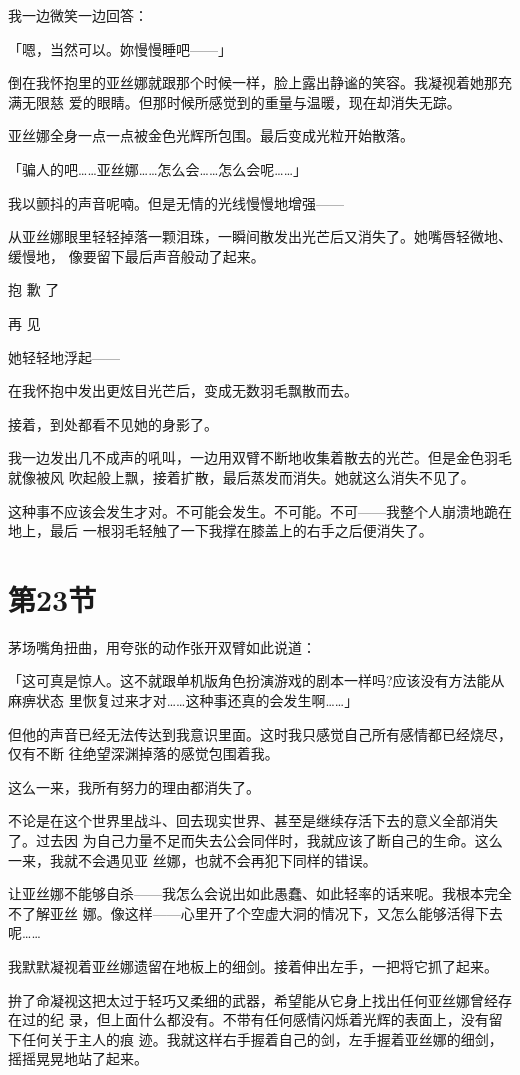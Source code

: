\documentclass[11pt]{book}
\begin{document}
我一边微笑一边回答：

「嗯，当然可以。妳慢慢睡吧——」

倒在我怀抱里的亚丝娜就跟那个时候一样，脸上露出静谧的笑容。我凝视着她那充满无限慈
爱的眼睛。但那时候所感觉到的重量与温暖，现在却消失无踪。

亚丝娜全身一点一点被金色光辉所包围。最后变成光粒开始散落。

「骗人的吧……亚丝娜……怎么会……怎么会呢……」

我以颤抖的声音呢喃。但是无情的光线慢慢地增强——

从亚丝娜眼里轻轻掉落一颗泪珠，一瞬间散发出光芒后又消失了。她嘴唇轻微地、缓慢地，
像要留下最后声音般动了起来。

抱 歉 了

再 见

她轻轻地浮起——

在我怀抱中发出更炫目光芒后，变成无数羽毛飘散而去。

接着，到处都看不见她的身影了。

我一边发出几不成声的吼叫，一边用双臂不断地收集着散去的光芒。但是金色羽毛就像被风
吹起般上飘，接着扩散，最后蒸发而消失。她就这么消失不见了。

这种事不应该会发生才对。不可能会发生。不可能。不可——我整个人崩溃地跪在地上，最后
一根羽毛轻触了一下我撑在膝盖上的右手之后便消失了。
\section{第23节}
\label{sec:org0a833b3}
茅场嘴角扭曲，用夸张的动作张开双臂如此说道：

「这可真是惊人。这不就跟单机版角色扮演游戏的剧本一样吗?应该没有方法能从麻痹状态
里恢复过来才对……这种事还真的会发生啊……」

但他的声音已经无法传达到我意识里面。这时我只感觉自己所有感情都已经烧尽，仅有不断
往绝望深渊掉落的感觉包围着我。

这么一来，我所有努力的理由都消失了。

不论是在这个世界里战斗、回去现实世界、甚至是继续存活下去的意义全部消失了。过去因
为自己力量不足而失去公会同伴时，我就应该了断自己的生命。这么一来，我就不会遇见亚
丝娜，也就不会再犯下同样的错误。

让亚丝娜不能够自杀——我怎么会说出如此愚蠢、如此轻率的话来呢。我根本完全不了解亚丝
娜。像这样——心里开了个空虚大洞的情况下，又怎么能够活得下去呢……

我默默凝视着亚丝娜遗留在地板上的细剑。接着伸出左手，一把将它抓了起来。

拚了命凝视这把太过于轻巧又柔细的武器，希望能从它身上找出任何亚丝娜曾经存在过的纪
录，但上面什么都没有。不带有任何感情闪烁着光辉的表面上，没有留下任何关于主人的痕
迹。我就这样右手握着自己的剑，左手握着亚丝娜的细剑，摇摇晃晃地站了起来。
\end{document}

